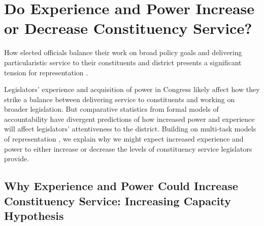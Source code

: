 \documentclass[12pt]{article}
\begin{document}
\section{Do Experience and Power Increase or Decrease Constituency Service?} \label{s:theory}

How elected officials balance their work on broad policy goals and delivering particularistic service to their constituents and district presents a significant tension for representation \citep{AshworthBuenodeMesquita2006}.

Legislators' experience and acquisition of power in Congress likely affect how they strike a balance between delivering service to constituents and working on broader legislation. But comparative statistics from formal models of accountability have divergent predictions of how increased power and experience will affect legislators' attentiveness to the district. Building on multi-task models of representation \citep{AshworthBuenodeMesquita2006, gordon2009advantages}, we explain why we might expect increased experience and power to either increase or decrease the levels of constituency service legislators provide.



\subsection{Why Experience and Power Could Increase Constituency Service: Increasing Capacity Hypothesis}
\end{document}
